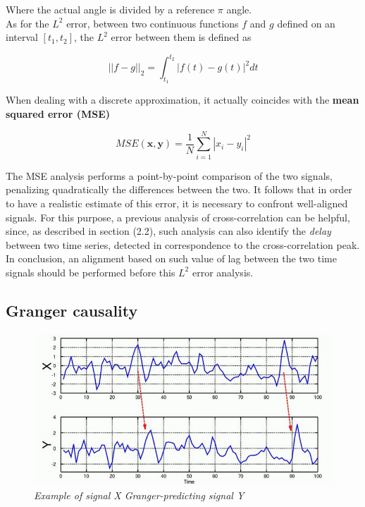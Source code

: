 \documentclass[a4paper]{article}
\begin{document}
 Where the actual angle is divided by a reference $\pi$ angle.
\\
As for the $L^2$ error, between two continuous functions $f$ and $g$ defined on an interval $[t_1,t_2]$, the $L^2$ error between them is defined as 

$$ ||f-g||_2 = \int_{t_1}^{t_2}|f(t) - g(t)|^2 dt $$

When dealing with a discrete approximation, it actually coincides with the \textbf{mean squared error (MSE)}

$$ MSE(\textbf{x},\textbf{y}) = \frac{1}{N}\sum_{i=1}^{N}|x_i-y_i|^2 $$


The MSE analysis performs a point-by-point comparison of the two signals, penalizing quadratically the differences between the two. It follows that in order to have a realistic estimate of this error, it is necessary to confront well-aligned signals. For this purpose, a previous analysis of cross-correlation can be helpful, since, as described in section (2.2), such analysis can also identify the \textit{delay} between two time series, detected in correspondence to the cross-correlation peak. In conclusion, an alignment based on such value of lag between the two time signals should be performed before this $L^2$ error analysis.



\subsection{Granger causality}


\begin{figure}[H]
	\begin{center}
		\hspace*{-1cm}
		\includegraphics[scale=.60]{GC.png} 
	\end{center} 
	\caption{\textit{Example of signal X Granger-predicting signal Y }}
	
\end{figure}
\end{document}
